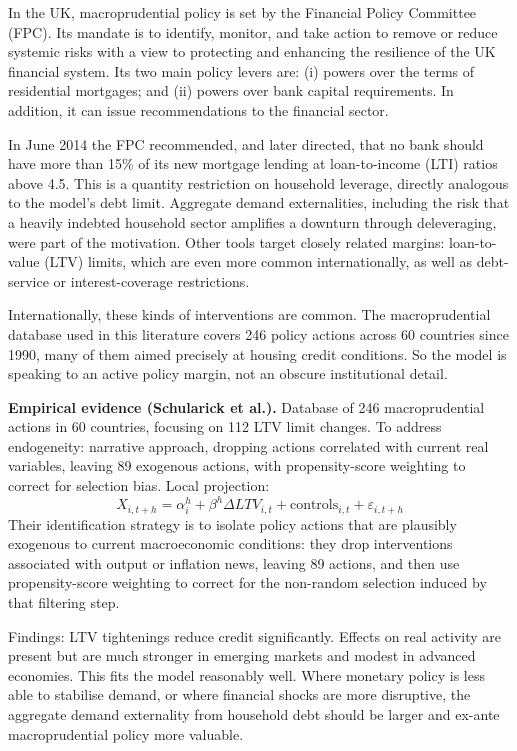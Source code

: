 \documentclass[11pt,a4paper]{article}
\begin{document}
In the UK, macroprudential policy is set by the Financial Policy Committee (FPC). Its mandate is to identify, monitor, and take action to remove or reduce systemic risks with a view to protecting and enhancing the resilience of the UK financial system. Its two main policy levers are: (i) powers over the terms of residential mortgages; and (ii) powers over bank capital requirements. In addition, it can issue recommendations to the financial sector.

In June 2014 the FPC recommended, and later directed, that no bank should have more than 15\% of its new mortgage lending at loan-to-income (LTI) ratios above 4.5. This is a quantity restriction on household leverage, directly analogous to the model's debt limit. Aggregate demand externalities, including the risk that a heavily indebted household sector amplifies a downturn through deleveraging, were part of the motivation. Other tools target closely related margins: loan-to-value (LTV) limits, which are even more common internationally, as well as debt-service or interest-coverage restrictions.

Internationally, these kinds of interventions are common. The macroprudential database used in this literature covers 246 policy actions across 60 countries since 1990, many of them aimed precisely at housing credit conditions. So the model is speaking to an active policy margin, not an obscure institutional detail.

\textbf{Empirical evidence (Schularick et al.).} Database of 246 macroprudential actions in 60 countries, focusing on 112 LTV limit changes. To address endogeneity: narrative approach, dropping actions correlated with current real variables, leaving 89 exogenous actions, with propensity-score weighting to correct for selection bias. Local projection:
\begin{equation}
X_{i,t+h} = \alpha_i^h + \beta^h \Delta LTV_{i,t} + \text{controls}_{i,t} + \varepsilon_{i,t+h}
\end{equation}
Their identification strategy is to isolate policy actions that are plausibly exogenous to current macroeconomic conditions: they drop interventions associated with output or inflation news, leaving 89 actions, and then use propensity-score weighting to correct for the non-random selection induced by that filtering step.

Findings: LTV tightenings reduce credit significantly. Effects on real activity are present but are much stronger in emerging markets and modest in advanced economies. This fits the model reasonably well. Where monetary policy is less able to stabilise demand, or where financial shocks are more disruptive, the aggregate demand externality from household debt should be larger and ex-ante macroprudential policy more valuable.
\end{document}
